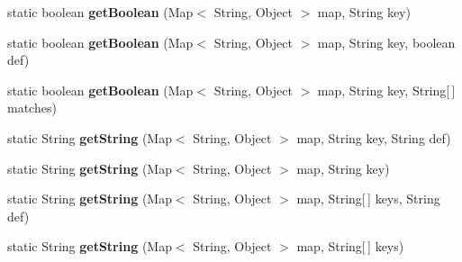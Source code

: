 \begin{DoxyCompactItemize}
\item 
\hypertarget{classdev_1_1boxy_1_1fortyfive_1_1utils_1_1_config_parser_a0f76ec56c721a17e402665326769c559}{
static boolean {\bfseries getBoolean} (Map$<$ String, Object $>$ map, String key)}
\label{db/d92/classdev_1_1boxy_1_1fortyfive_1_1utils_1_1_config_parser_a0f76ec56c721a17e402665326769c559}

\item 
\hypertarget{classdev_1_1boxy_1_1fortyfive_1_1utils_1_1_config_parser_a20eff216bd6a77824b67bcfa53dc29de}{
static boolean {\bfseries getBoolean} (Map$<$ String, Object $>$ map, String key, boolean def)}
\label{db/d92/classdev_1_1boxy_1_1fortyfive_1_1utils_1_1_config_parser_a20eff216bd6a77824b67bcfa53dc29de}

\item 
\hypertarget{classdev_1_1boxy_1_1fortyfive_1_1utils_1_1_config_parser_a01c637da101b21b9a81fb06272389ed3}{
static boolean {\bfseries getBoolean} (Map$<$ String, Object $>$ map, String key, String\mbox{[}$\,$\mbox{]} matches)}
\label{db/d92/classdev_1_1boxy_1_1fortyfive_1_1utils_1_1_config_parser_a01c637da101b21b9a81fb06272389ed3}

\item 
\hypertarget{classdev_1_1boxy_1_1fortyfive_1_1utils_1_1_config_parser_a2ce7433568eb649de55f9b177be2d1f7}{
static String {\bfseries getString} (Map$<$ String, Object $>$ map, String key, String def)}
\label{db/d92/classdev_1_1boxy_1_1fortyfive_1_1utils_1_1_config_parser_a2ce7433568eb649de55f9b177be2d1f7}

\item 
\hypertarget{classdev_1_1boxy_1_1fortyfive_1_1utils_1_1_config_parser_ae4d33660f5495ad09e771eb830c5caf0}{
static String {\bfseries getString} (Map$<$ String, Object $>$ map, String key)}
\label{db/d92/classdev_1_1boxy_1_1fortyfive_1_1utils_1_1_config_parser_ae4d33660f5495ad09e771eb830c5caf0}

\item 
\hypertarget{classdev_1_1boxy_1_1fortyfive_1_1utils_1_1_config_parser_a69ffb181e23b5614f416106d05571ee5}{
static String {\bfseries getString} (Map$<$ String, Object $>$ map, String\mbox{[}$\,$\mbox{]} keys, String def)}
\label{db/d92/classdev_1_1boxy_1_1fortyfive_1_1utils_1_1_config_parser_a69ffb181e23b5614f416106d05571ee5}

\item 
\hypertarget{classdev_1_1boxy_1_1fortyfive_1_1utils_1_1_config_parser_a88c5fa6c5bfc4827e01c20a3b65618ee}{
static String {\bfseries getString} (Map$<$ String, Object $>$ map, String\mbox{[}$\,$\mbox{]} keys)}
\label{db/d92/classdev_1_1boxy_1_1fortyfive_1_1utils_1_1_config_parser_a88c5fa6c5bfc4827e01c20a3b65618ee}


\end{DoxyCompactItemize}
